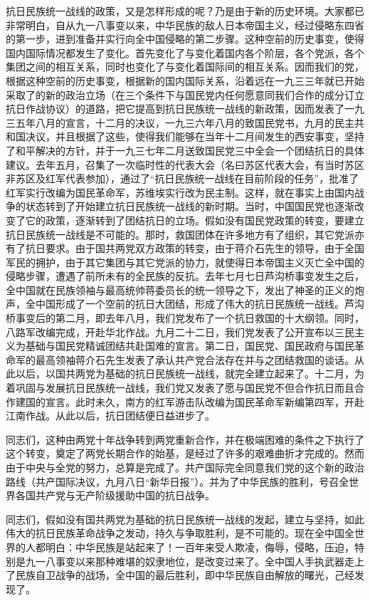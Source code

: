 抗日民族统一战线的政策，又是怎样形成的呢？乃是由于新的历史环境。大家都已非常明白，自从九一八事变以来，中华民族的敌人日本帝国主义，经过侵略东四省的第一步，进到准备并实行向全中国侵略的第二步骤。这种空前的历史事变，使得国内国际情况都发生了变化。首先变化了与变化着国内各个阶层，各个党派，各个集团之间的相互关系，同时也变化了与变化着国际间的相互关系。因而我们的党，根据这种空前的历史事变，根据新的国内国际关系，沿着远在一九三三年就已开始采取了的新的政治立场（在三个条件下与国民党内任何愿意同我们合作的成分订立抗日作战协议）的道路，把它提高到抗日民族统一战线的新政策，因而发表了一九三五年八月的宣言，十二月的决议，一九三六年八月的致国民党书，九月的民主共和国决议，并且根据了这些，使得我们能够在当年十二月间发生的西安事变，坚持了和平解决的方针，并于一九三七年二月送致国民党三中全会一个团结抗日的具体建议。去年五月，召集了一次临时性的代表大会（名曰苏区代表大会，有当时苏区非苏区及红军代表参加），通过了“抗日民族统一战线在目前阶段的任务”，批准了红军实行改编为国民革命军，苏维埃实行改为民主制。这样，就在事实上由国内战争的状态转到了开始建立抗日民族统一战线的新时期。当时，中国国民党也逐渐改变了它的政策，逐渐转到了团结抗日的立场。假如没有国民党政策的转变，要建立抗日民族统一战线是不可能的。那时，救国团体在许多地方有了组织，其它党派亦有了抗日要求。由于国共两党双方政策的转变，由于蒋介石先生的领导，由于全国军民的拥护，由于其它集团与其它党派的协力，就使得日本帝国主义灭亡全中国的侵略步骤，遭遇了前所未有的全民族的反抗。去年七月七日芦沟桥事变发生之后，全中国就在民族领袖与最高统帅蒋委员长的统一领导之下，发出了神圣的正义的炮声，全中国形成了一个空前的抗日大团结，形成了伟大的抗日民族统一战线。芦沟桥事变后的第二月，即去年八月，我们党发布了一个抗日救国的十大纲领。同时，八路军改编完成，开赴华北作战。九月二十二日，我们党发表了公开宣布以三民主义为基础与国民党精诚团结共赴国难的宣言。第二日，国民党、国民政府与国民革命军的最高领袖蒋介石先生发表了承认共产党合法存在并与之团结救国的谈话。从此以后，以国共两党为基础的抗日民族统一战线，就完全建立起来了。十二月，为着巩固与发展抗日民族统一战线，我们党又发表了愿与国民党不但合作抗日而且合作建国的宣言。此时未久，南方的红军游击队改编为国民革命军新编第四军，开赴江南作战。从此以后，抗日团结便日益进步了。

同志们，这种由两党十年战争转到两党重新合作，并在极端困难的条件之下执行了这个转变，奠定了两党长期合作的始基，是经过了许多的艰难曲折才完成的。然而由于中央与全党的努力，总算是完成了。共产国际完全同意我们党的这个新的政治路线（共产国际决议，九月八日“新华日报”）。并为了中华民族的胜利，号召全世界各国共产党与无产阶级援助中国的抗日战争。

同志们，假如没有国共两党为基础的抗日民族统一战线的发起，建立与坚持，如此伟大的抗日民族革命战争之发动，持久与争取胜利，是不可能的。现在全中国全世界的人都明白：中华民族是站起来了！一百年来受人欺凌，侮辱，侵略，压迫，特别是九一八事变以来那种难堪的奴隶地位，是改变过来了。全中国人手执武器走上了民族自卫战争的战场，全中国的最后胜利，即中华民族自由解放的曙光，己经发现了。

